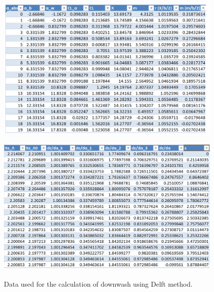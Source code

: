 \begin{figure}[H]
\centering
{\includegraphics[height=7cm]{immagini/delft}} 
\label{delftdata}
\end{figure} 
\begin{figure}[H]
\centering
{\includegraphics[height=7cm]{immagini/delftdata}} 
\caption{Data used for the calculation of downwash using Delft method.}
\label{delftdata}
\end{figure} 


